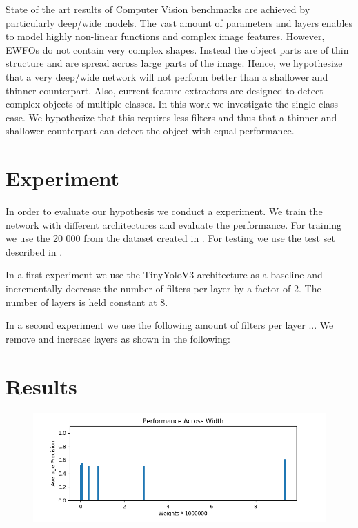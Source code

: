 	State of the art results of Computer Vision benchmarks are achieved by particularly deep/wide models. The vast amount of parameters and layers enables to model highly non-linear functions and complex image features. However, \acp{EWFO} do not contain very complex shapes. Instead the object parts are of thin structure and are spread across large parts of the image. Hence, we hypothesize that a very deep/wide network will not perform better than a shallower and thinner counterpart. Also, current feature extractors are designed to detect complex objects of multiple classes. In this work we investigate the single class case. We hypothesize that this requires less filters and thus that a thinner and shallower counterpart can detect the object with equal performance.
	
	\section{Experiment}
	
	In order to evaluate our hypothesis we conduct a experiment. We train the network with different architectures and evaluate the performance. For training we use the 20 000 from the dataset created in . For testing we use the test set described in .
	
	In a first experiment we use the TinyYoloV3 architecture as a baseline and incrementally decrease the number of filters per layer by a factor of 2. The number of layers is held constant at 8.
	
	In a second experiment we use the following amount of filters per layer ... We remove and increase layers as shown in the following: 
	
	
	\section{Results}
	
	\begin{figure}
		\includegraphics[width=\textwidth]{fig/perf_width}
	\end{figure}

